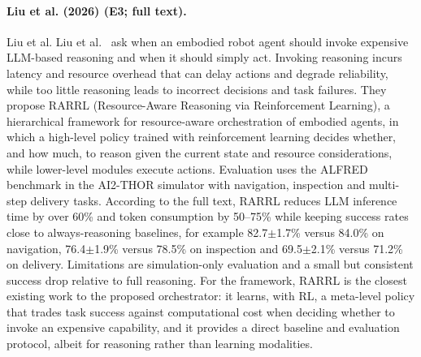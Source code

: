 \documentclass[10pt,a4paper]{article}
\begin{document}
\paragraph{Liu et al. (2026) (E3; full text).} Liu et al. Liu et al.~\cite{Liu2026} ask when an embodied robot agent should invoke expensive LLM-based reasoning and when it should simply act. Invoking reasoning incurs latency and resource overhead that can delay actions and degrade reliability, while too little reasoning leads to incorrect decisions and task failures. They propose RARRL (Resource-Aware Reasoning via Reinforcement Learning), a hierarchical framework for resource-aware orchestration of embodied agents, in which a high-level policy trained with reinforcement learning decides whether, and how much, to reason given the current state and resource considerations, while lower-level modules execute actions. Evaluation uses the ALFRED benchmark in the AI2-THOR simulator with navigation, inspection and multi-step delivery tasks. According to the full text, RARRL reduces LLM inference time by over 60\% and token consumption by 50--75\% while keeping success rates close to always-reasoning baselines, for example 82.7$\pm$1.7\% versus 84.0\% on navigation, 76.4$\pm$1.9\% versus 78.5\% on inspection and 69.5$\pm$2.1\% versus 71.2\% on delivery. Limitations are simulation-only evaluation and a small but consistent success drop relative to full reasoning. For the framework, RARRL is the closest existing work to the proposed orchestrator: it learns, with RL, a meta-level policy that trades task success against computational cost when deciding whether to invoke an expensive capability, and it provides a direct baseline and evaluation protocol, albeit for reasoning rather than learning modalities.
\end{document}
